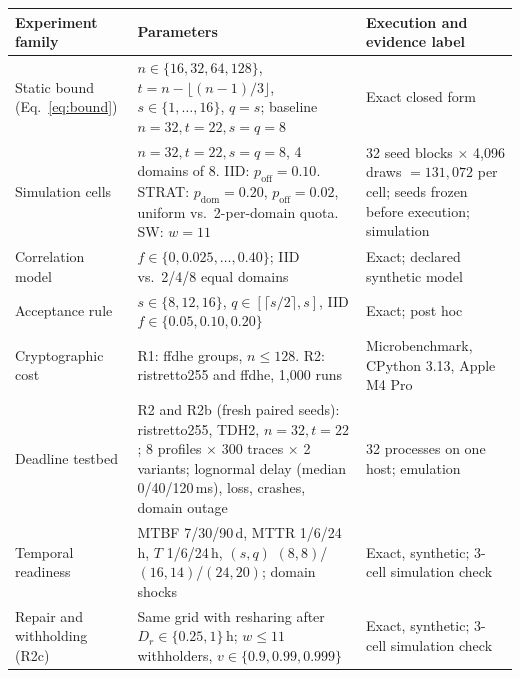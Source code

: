 \begin{tabularx}{\textwidth}{@{}>{\raggedright\arraybackslash}p{}>{\raggedright\arraybackslash}p{}X@{}}
\toprule
Experiment family & Parameters & Execution and evidence label\\
\midrule
Static bound (Eq.~\ref{eq:bound}) & $n\in\{16,32,64,128\}$, $t=n-\lfloor (n-1)/3\rfloor$, $s\in\{1,\dots,16\}$, $q=s$; baseline $n=32,t=22,s=q=8$ & Exact closed form\\
Simulation cells & $n=32,t=22,s=q=8$, 4 domains of 8. IID: $p_{\mathrm{off}}=0.10$. STRAT: $p_{\mathrm{dom}}=0.20$, $p_{\mathrm{off}}=0.02$, uniform vs.\ 2-per-domain quota. SW: $w=11$ & 32 seed blocks $\times$ 4{,}096 draws $=131{,}072$ per cell; seeds frozen before execution; simulation\\
Correlation model & $f\in\{0,0.025,\dots,0.40\}$; IID vs.\ 2/4/8 equal domains & Exact; declared synthetic model\\
Acceptance rule & $s\in\{8,12,16\}$, $q\in[\lceil s/2\rceil,s]$, IID $f\in\{0.05,0.10,0.20\}$ & Exact; post hoc\\
Cryptographic cost & R1: ffdhe groups, $n\le 128$. R2: ristretto255 and ffdhe, 1{,}000 runs & Microbenchmark, CPython 3.13, Apple M4 Pro\\
Deadline testbed & R2 and R2b (fresh paired seeds): ristretto255, TDH2, $n=32,t=22$; 8 profiles $\times$ 300 traces $\times$ 2 variants; lognormal delay (median 0/40/120\,ms), loss, crashes, domain outage & 32 processes on one host; emulation\\
Temporal readiness & MTBF 7/30/90\,d, MTTR 1/6/24\,h, $T$ 1/6/24\,h, $(s,q)$ $(8,8)$/$(16,14)$/$(24,20)$; domain shocks & Exact, synthetic; 3-cell simulation check\\
Repair and withholding (R2c) & Same grid with resharing after $D_r\in\{0.25,1\}$\,h; $w\le 11$ withholders, $v\in\{0.9,0.99,0.999\}$ & Exact, synthetic; 3-cell simulation check\\
\bottomrule
\end{tabularx}
